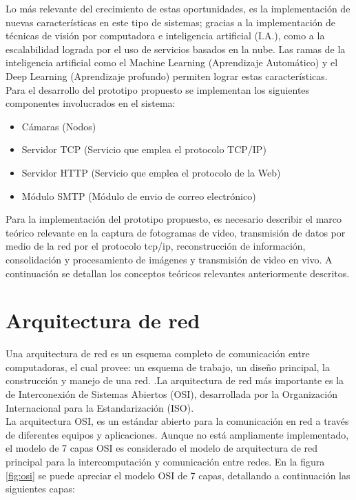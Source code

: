 Lo más relevante del crecimiento de estas oportunidades, es la implementación de nuevas características en este tipo de sistemas; gracias a la implementación de técnicas de visión por computadora e inteligencia artificial (I.A.), como a la escalabilidad lograda por el uso de servicios basados en la nube. Las ramas de la inteligencia artificial como el Machine Learning (Aprendizaje Automático) y el Deep Learning (Aprendizaje profundo) permiten lograr estas características.\\

Para el desarrollo del prototipo propuesto se implementan los siguientes componentes involucrados en el sistema:
\begin{itemize}
    \item Cámaras (Nodos)
    \item Servidor TCP (Servicio que emplea el protocolo TCP/IP)
    \item Servidor HTTP (Servicio que emplea el protocolo de la Web)
    \item Módulo SMTP (Módulo de envio de correo electrónico)
\end{itemize}

Para la implementación del prototipo propuesto, es necesario describir el marco teórico relevante en la captura de fotogramas de video, transmisión de datos por medio de la red por el protocolo tcp/ip, reconstrucción de información, consolidación y procesamiento de imágenes y transmisión de video en vivo. A continuación se detallan los conceptos teóricos relevantes anteriormente descritos.\\

\section{Arquitectura de red}
Una arquitectura de red es un esquema completo de comunicación entre computadoras, el cual provee: un esquema de trabajo, un diseño principal, la construcción y manejo de una red. \cite[1]{networkProtocolos:handbook}.La arquitectura de red más importante es la de Interconexión de Sistemas Abiertos (OSI), desarrollada por la Organización Internacional para la Estandarización (ISO).\\

La arquitectura OSI, es un estándar abierto para la comunicación en red a través de diferentes equipos y aplicaciones. Aunque no está ampliamente implementado, el modelo de 7 capas OSI es considerado el modelo de arquitectura de red principal para la intercomputación y comunicación entre redes. En la figura \ref{fig:osi} se puede apreciar el modelo OSI de 7 capas, detallando a continuación las siguientes capas:

